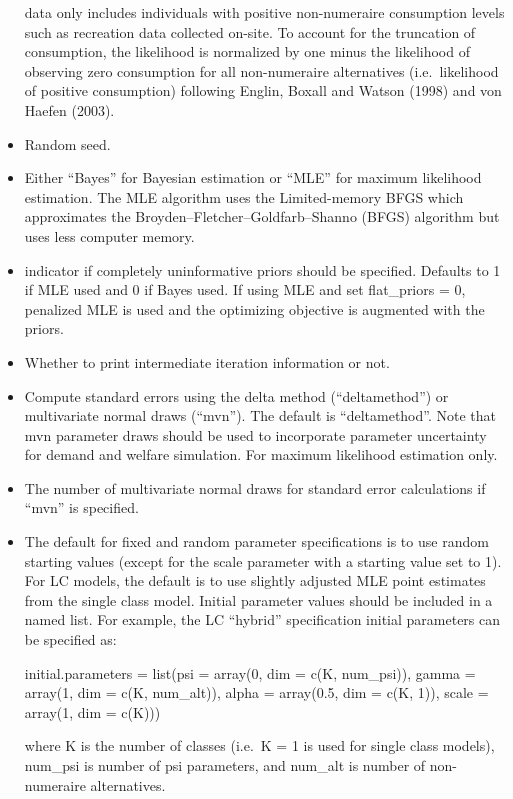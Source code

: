 \begin{itemize}
  data only includes individuals with positive non-numeraire consumption
  levels such as recreation data collected on-site. To account for the
  truncation of consumption, the likelihood is normalized by one minus
  the likelihood of observing zero consumption for all non-numeraire
  alternatives (i.e.~likelihood of positive consumption) following
  Englin, Boxall and Watson (1998) and von Haefen (2003).
\item
   Random seed.
\item
   Either ``Bayes'' for Bayesian estimation or ``MLE''
  for maximum likelihood estimation. The MLE algorithm uses the
  Limited-memory BFGS which approximates the
  Broyden--Fletcher--Goldfarb--Shanno (BFGS) algorithm but uses less
  computer memory.
\item
   indicator if completely uninformative priors
  should be specified. Defaults to 1 if MLE used and 0 if Bayes used. If
  using MLE and set flat\_priors = 0, penalized MLE is used and the
  optimizing objective is augmented with the priors.
\item
   Whether to print intermediate iteration
  information or not.
\item
   Compute standard errors using the delta method
  (``deltamethod'') or multivariate normal draws (``mvn''). The default
  is ``deltamethod''. Note that mvn parameter draws should be used to
  incorporate parameter uncertainty for demand and welfare simulation.
  For maximum likelihood estimation only.
\item
   The number of multivariate normal draws for standard
  error calculations if ``mvn'' is specified.
\item
   The default for fixed and random parameter
  specifications is to use random starting values (except for the scale
  parameter with a starting value set to 1). For LC models, the default
  is to use slightly adjusted MLE point estimates from the single class
  model. Initial parameter values should be included in a named list.
  For example, the LC ``hybrid'' specification initial parameters can be
  specified as: 
  \begin{example}
  initial.parameters = list(psi = array(0, dim = c(K, num_psi)), 
                          gamma = array(1, dim = c(K, num_alt)), 
                          alpha = array(0.5, dim = c(K, 1)), 
                          scale = array(1, dim = c(K))) 
  \end{example}
  where K is the number of classes (i.e.~K = 1 is used for single 
  class models),  num\_psi is number of psi parameters, and num\_alt is 
  number of non-numeraire alternatives.
\end{itemize}

